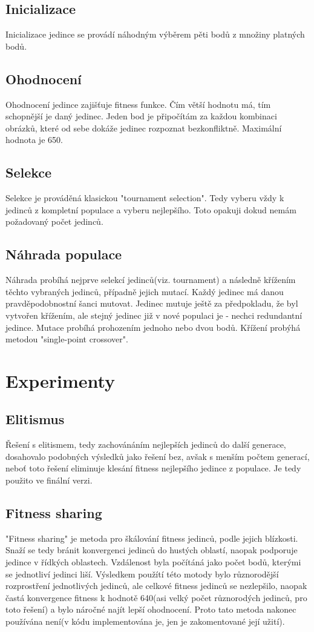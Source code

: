 \documentclass[12pt,a4paper]{article}
\begin{document}
\subsection{Inicializace}
Inicializace jedince se provádí náhodným výběrem pěti bodů z množiny platných bodů. 
\subsection{Ohodnocení}
Ohodnocení jedince zajišťuje fitness funkce. Čím větší hodnotu má, tím schopnější je daný jedinec. Jeden bod je připočítám za každou kombinaci obrázků, které od sebe dokáže jedinec rozpoznat bezkonfliktně. Maximální hodnota je 650. 
\subsection{Selekce}
Selekce je prováděná klasickou "tournament selection". Tedy vyberu vždy k jedinců z kompletní populace a vyberu nejlepšího. Toto opakuji dokud nemám požadovaný počet jedinců.
\subsection{Náhrada populace}
Náhrada probíhá nejprve selekcí jedinců(viz. tournament) a následně křížením těchto vybraných jedinců, případně jejich mutací. Každý jedinec má danou pravděpodobnostní šanci mutovat. Jedinec mutuje ještě za předpokladu, že byl vytvořen křížením, ale stejný jedinec již v nové populaci je - nechci redundantní jedince. Mutace probíhá prohozením jednoho nebo dvou bodů. Křížení probýhá metodou "single-point crossover".


\newpage
\section{Experimenty}
\subsection{Elitismus}
Řešení s elitismem, tedy zachovánáním nejlepších jedinců do další generace, dosahovalo podobných výsledků jako řešení bez, avšak s menším počtem generací, neboť toto řešení eliminuje klesání fitness nejlepšího jedince z populace. Je tedy použito ve finální verzi.
\subsection{Fitness sharing}
"Fitness sharing" je metoda pro škálování fitness jedinců, podle jejich blízkosti. Snaží se tedy bránit konvergenci jedinců do hustých oblastí, naopak podporuje jedince v řídkých oblastech. Vzdálenost byla počítáná jako počet bodů, kterými se jednotliví jedinci liší. Výsledkem použítí této motody bylo různorodější rozprostření jednotlivých jedinců, ale celkové fitness jedinců se nezlepšilo, naopak častá konvergence fitness k hodnotě 640(asi velký počet různorodých jedinců, pro toto řešení) a bylo náročné najít lepší ohodnocení. Proto tato metoda nakonec používána není(v kódu implementována je, jen je zakomentované její užití).
\end{document}
